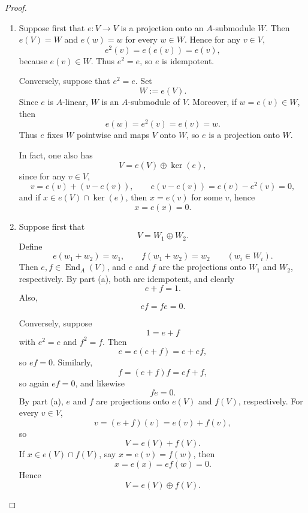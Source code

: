 \begin{proof}
    \begin{enumerate}
        \renewcommand{\labelenumi}{(\alph{enumi})}

        \item Suppose first that \(e\colon V\to V\) is a projection onto an \(A\)-submodule \(W\).
              Then \(e(V)=W\) and \(e(w)=w\) for every \(w\in W\). Hence for any \(v\in V\),
              \[
                  e^2(v)=e(e(v))=e(v),
              \]
              because \(e(v)\in W\). Thus \(e^2=e\), so \(e\) is idempotent.

              Conversely, suppose that \(e^2=e\). Set
              \[
                  W:=e(V).
              \]
              Since \(e\) is \(A\)-linear, \(W\) is an \(A\)-submodule of \(V\). Moreover, if \(w=e(v)\in W\), then
              \[
                  e(w)=e^2(v)=e(v)=w.
              \]
              Thus \(e\) fixes \(W\) pointwise and maps \(V\) onto \(W\), so \(e\) is a projection onto \(W\).

              In fact, one also has
              \[
                  V=e(V)\oplus \ker(e),
              \]
              since for any \(v\in V\),
              \[
                  v=e(v)+(v-e(v)),
                  \qquad e(v-e(v))=e(v)-e^2(v)=0,
              \]
              and if \(x\in e(V)\cap \ker(e)\), then \(x=e(v)\) for some \(v\), hence
              \[
                  x=e(x)=0.
              \]

        \item Suppose first that
              \[
                  V=W_1\oplus W_2.
              \]
              Define
              \[
                  e(w_1+w_2)=w_1,
                  \qquad
                  f(w_1+w_2)=w_2
                  \qquad (w_i\in W_i).
              \]
              Then \(e,f\in \operatorname{End}_A(V)\), and \(e\) and \(f\) are the projections onto
              \(W_1\) and \(W_2\), respectively. By part (a), both are idempotent, and clearly
              \[
                  e+f=1.
              \]
              Also,
              \[
                  ef=fe=0.
              \]

              Conversely, suppose
              \[
                  1=e+f
              \]
              with \(e^2=e\) and \(f^2=f\). Then
              \[
                  e=e(e+f)=e+ef,
              \]
              so \(ef=0\). Similarly,
              \[
                  f=(e+f)f=ef+f,
              \]
              so again \(ef=0\), and likewise
              \[
                  fe=0.
              \]
              By part (a), \(e\) and \(f\) are projections onto \(e(V)\) and \(f(V)\), respectively.
              For every \(v\in V\),
              \[
                  v=(e+f)(v)=e(v)+f(v),
              \]
              so
              \[
                  V=e(V)+f(V).
              \]
              If \(x\in e(V)\cap f(V)\), say \(x=e(v)=f(w)\), then
              \[
                  x=e(x)=ef(w)=0.
              \]
              Hence
              \[
                  V=e(V)\oplus f(V).
              \]


\end{enumerate}
\end{proof}
